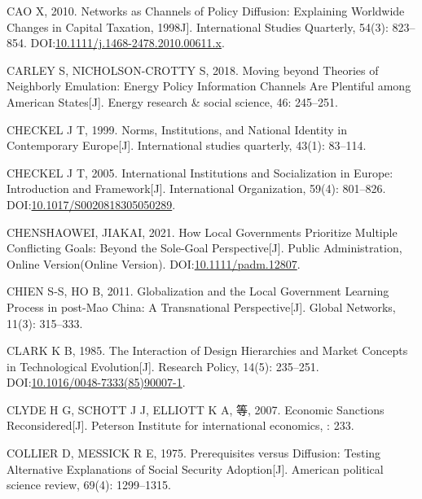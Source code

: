\documentclass[
  12pt,
]{ctexart}
\newlength{\cslhangindent}
\newlength{\cslentryspacingunit} %
\newenvironment{CSLReferences}[2] %
 {%
  \setlength{\parindent}{0pt}
  \ifodd #1
  \let\oldpar\par
  \def\par{\hangindent=\cslhangindent\oldpar}
  \fi
  \setlength{\parskip}{#2\cslentryspacingunit}
 }%
 {}
\begin{document}
\begin{CSLReferences}{1}{0}
\leavevmode{}%
CAO X, 2010. Networks as {Channels} of {Policy Diffusion}: {Explaining Worldwide Changes} in {Capital Taxation}, 1998\textendash 2006{[}J{]}. International Studies Quarterly, 54(3): 823--854. DOI:\href{https://doi.org/10.1111/j.1468-2478.2010.00611.x}{10.1111/j.1468-2478.2010.00611.x}.

\leavevmode{}%
CARLEY S, NICHOLSON-CROTTY S, 2018. Moving beyond Theories of Neighborly Emulation: {Energy} Policy Information Channels Are Plentiful among {American} States{[}J{]}. Energy research \& social science, 46: 245--251.

\leavevmode{}%
CHECKEL J T, 1999. Norms, Institutions, and National Identity in Contemporary {Europe}{[}J{]}. International studies quarterly, 43(1): 83--114.

\leavevmode{}%
CHECKEL J T, 2005. International {Institutions} and {Socialization} in {Europe}: {Introduction} and {Framework}{[}J{]}. International Organization, 59(4): 801--826. DOI:\href{https://doi.org/10.1017/S0020818305050289}{10.1017/S0020818305050289}.

\leavevmode{}%
CHENSHAOWEI, JIAKAI, 2021. How Local Governments Prioritize Multiple Conflicting Goals: {Beyond} the Sole-Goal Perspective{[}J{]}. Public Administration, Online Version(Online Version). DOI:\href{https://doi.org/10.1111/padm.12807}{10.1111/padm.12807}.

\leavevmode{}%
CHIEN S-S, HO B, 2011. Globalization and the Local Government Learning Process in post-{Mao China}: A Transnational Perspective{[}J{]}. Global Networks, 11(3): 315--333.

\leavevmode{}%
CLARK K B, 1985. The Interaction of Design Hierarchies and Market Concepts in Technological Evolution{[}J{]}. Research Policy, 14(5): 235--251. DOI:\href{https://doi.org/10.1016/0048-7333(85)90007-1}{10.1016/0048-7333(85)90007-1}.

\leavevmode{}%
CLYDE H G, SCHOTT J J, ELLIOTT K A, 等, 2007. Economic {Sanctions Reconsidered}{[}J{]}. Peterson Institute for international economics, : 233.

\leavevmode{}%
COLLIER D, MESSICK R E, 1975. Prerequisites versus Diffusion: {Testing} Alternative Explanations of Social Security Adoption{[}J{]}. American political science review, 69(4): 1299--1315.


\end{CSLReferences}
\end{document}
